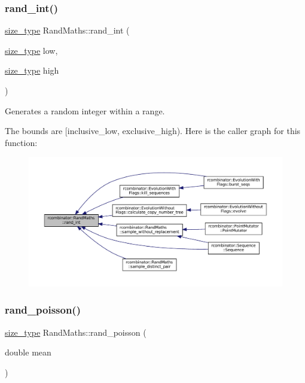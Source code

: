\subsubsection{\texorpdfstring{rand\+\_\+int()}{rand\_int()}}
{\footnotesize\ttfamily \mbox{\hyperlink{constants_8h_abcd18a5521fc90ff6e7b00e4fee98397}{size\+\_\+type}} Rand\+Maths\+::rand\+\_\+int (\begin{DoxyParamCaption}\item[{\mbox{\hyperlink{constants_8h_abcd18a5521fc90ff6e7b00e4fee98397}{size\+\_\+type}}}]{low,  }\item[{\mbox{\hyperlink{constants_8h_abcd18a5521fc90ff6e7b00e4fee98397}{size\+\_\+type}}}]{high }\end{DoxyParamCaption})}



Generates a random integer within a range. 

The bounds are \mbox{[}inclusive\+\_\+low, exclusive\+\_\+high). Here is the caller graph for this function\+:
\nopagebreak
\begin{figure}[H]
\begin{center}
\leavevmode
\includegraphics[width=350pt]{classrcombinator_1_1RandMaths_a8072bad64e64ef042e5257e1bee85635_icgraph}
\end{center}
\end{figure}
\mbox{\label{classrcombinator_1_1RandMaths_adef66efd4d58f6130982ff0ee0e25750}} 
\subsubsection{\texorpdfstring{rand\+\_\+poisson()}{rand\_poisson()}}
{\footnotesize\ttfamily \mbox{\hyperlink{constants_8h_abcd18a5521fc90ff6e7b00e4fee98397}{size\+\_\+type}} Rand\+Maths\+::rand\+\_\+poisson (\begin{DoxyParamCaption}\item[{double}]{mean }\end{DoxyParamCaption})}



